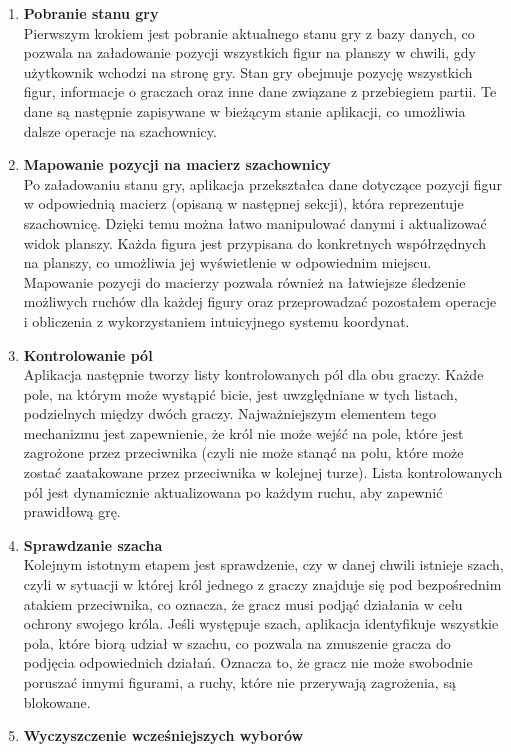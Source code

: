 \documentclass[12pt,a4paper]{article}
\begin{document}
\begin{enumerate}
    \item \textbf{Pobranie stanu gry}\\
    Pierwszym krokiem jest pobranie aktualnego stanu gry z bazy danych, co pozwala na załadowanie pozycji wszystkich figur na planszy w chwili, gdy użytkownik wchodzi na stronę gry. Stan gry obejmuje pozycję wszystkich figur, informacje o graczach oraz inne dane związane z przebiegiem partii. Te dane są następnie zapisywane w bieżącym stanie aplikacji, co umożliwia dalsze operacje na szachownicy.
    \item \textbf{Mapowanie pozycji na macierz szachownicy}\\
    Po załadowaniu stanu gry, aplikacja przekształca dane dotyczące pozycji figur w odpowiednią macierz (opisaną w następnej sekcji), która reprezentuje szachownicę. Dzięki temu można łatwo manipulować danymi i aktualizować widok planszy. Każda figura jest przypisana do konkretnych współrzędnych na planszy, co umożliwia jej wyświetlenie w odpowiednim miejscu. Mapowanie pozycji do macierzy pozwala również na łatwiejsze śledzenie możliwych ruchów dla każdej figury oraz przeprowadzać pozostałem operacje i obliczenia z wykorzystaniem intuicyjnego systemu koordynat.
    \item \textbf{Kontrolowanie pól}\\
    Aplikacja następnie tworzy listy kontrolowanych pól dla obu graczy. Każde pole, na którym może wystąpić bicie, jest uwzględniane w tych listach, podzielnych między dwóch graczy. Najważniejszym elementem tego mechanizmu jest zapewnienie, że król nie może wejść na pole, które jest zagrożone przez przeciwnika (czyli nie może stanąć na polu, które może zostać zaatakowane przez przeciwnika w kolejnej turze). Lista kontrolowanych pól jest dynamicznie aktualizowana po każdym ruchu, aby zapewnić prawidłową grę.
    \item \textbf{Sprawdzanie szacha}\\
    Kolejnym istotnym etapem jest sprawdzenie, czy w danej chwili istnieje szach, czyli w sytuacji w której król jednego z graczy znajduje się pod bezpośrednim atakiem przeciwnika, co oznacza, że gracz musi podjąć działania w celu ochrony swojego króla. Jeśli występuje szach, aplikacja identyfikuje wszystkie pola, które biorą udział w szachu, co pozwala na zmuszenie gracza do podjęcia odpowiednich działań. Oznacza to, że gracz nie może swobodnie poruszać innymi figurami, a ruchy, które nie przerywają zagrożenia, są blokowane.
    \item \textbf{Wyczyszczenie wcześniejszych wyborów}\\

\end{enumerate}
\end{document}

